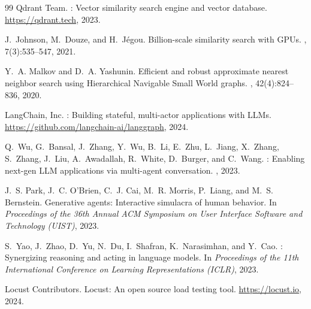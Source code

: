 \documentclass[sigconf]{acmart}
\begin{document}
\begin{thebibliography}{99}
{Qdrant Team}.
: Vector similarity search engine and vector database.
\newblock \url{https://qdrant.tech}, 2023.

J.~Johnson, M.~Douze, and H.~J\'{e}gou.
\newblock Billion-scale similarity search with {GPUs}.
, 7(3):535--547, 2021.

Y.~A. Malkov and D.~A. Yashunin.
\newblock Efficient and robust approximate nearest neighbor search using
  {Hierarchical Navigable Small World} graphs.
,
  42(4):824--836, 2020.

{LangChain, Inc.}
: Building stateful, multi-actor applications with {LLMs}.
\newblock \url{https://github.com/langchain-ai/langgraph}, 2024.

Q.~Wu, G.~Bansal, J.~Zhang, Y.~Wu, B.~Li, E.~Zhu, L.~Jiang, X.~Zhang,
  S.~Zhang, J.~Liu, A.~Awadallah, R.~White, D.~Burger, and C.~Wang.
: Enabling next-gen {LLM} applications via multi-agent
  conversation.
, 2023.

J.~S. Park, J.~C. O'Brien, C.~J. Cai, M.~R. Morris, P.~Liang, and
  M.~S. Bernstein.
\newblock Generative agents: Interactive simulacra of human behavior.
\newblock In {\em Proceedings of the 36th Annual ACM Symposium on User Interface
  Software and Technology (UIST)}, 2023.

S.~Yao, J.~Zhao, D.~Yu, N.~Du, I.~Shafran, K.~Narasimhan, and Y.~Cao.
: Synergizing reasoning and acting in language models.
\newblock In {\em Proceedings of the 11th International Conference on Learning
  Representations (ICLR)}, 2023.

{Locust Contributors}.
\newblock Locust: An open source load testing tool.
\newblock \url{https://locust.io}, 2024.

\end{thebibliography}
\end{document}
